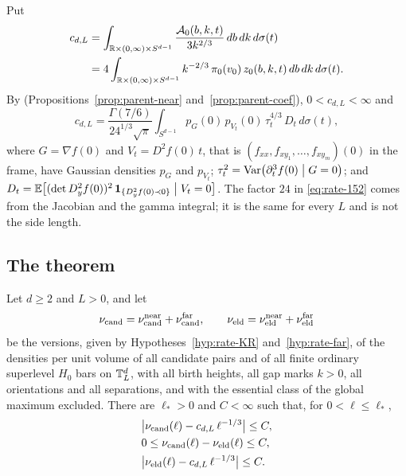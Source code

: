 \begin{definition}\label{def:rate-coef}
Put
\begin{equation}\label{eq:rate-c}
\begin{aligned}
c_{d,L}&=\int_{\mathbb R\times(0,\infty)\times S^{d-1}}\frac{\mathcal A_0(b,k,t)}{3k^{2/3}}\,db\,dk\,d\sigma(t)\\
&=4\int_{\mathbb R\times(0,\infty)\times S^{d-1}}k^{-2/3}\,\pi_0(v_0)\,z_0(b,k,t)\,db\,dk\,d\sigma(t).
\end{aligned}
\end{equation}
By \cite[(13.6) and \S15]{parentP} (Propositions~\ref{prop:parent-near} and~\ref{prop:parent-coef}), $0<c_{d,L}<\infty$ and
\begin{equation}\label{eq:rate-152}
c_{d,L}=\frac{\Gamma(7/6)}{24^{1/3}\sqrt\pi}\int_{S^{d-1}}p_G(0)\,p_{V_t}(0)\,\tau_t^{4/3}\,D_t\,d\sigma(t),
\end{equation}
where $G=\nabla f(0)$ and $V_t=D^2f(0)\,t$, that is $(f_{xx},f_{xy_1},\dots,f_{xy_m})(0)$ in the frame, have Gaussian densities $p_G$ and $p_{V_t}$; $\tau_t^2=\operatorname{Var}\bigl(\partial_t^3f(0)\bigm|G=0\bigr)$; and $D_t=\mathbb E\bigl[(\det D_y^2f(0))^2\,\mathbf 1_{\{D_y^2f(0)\prec0\}}\bigm|V_t=0\bigr]$. The factor $24$ in \eqref{eq:rate-152} comes from the Jacobian and the gamma integral; it is the same for every $L$ and is not the side length.
\end{definition}

\subsection*{The theorem}

\begin{theorem}\label{thm:rate-bounded}
Let $d\ge2$ and $L>0$, and let
\[
\nu_{\mathrm{cand}}=\nu^{\rm near}_{\mathrm{cand}}+\nu^{\rm far}_{\mathrm{cand}},\qquad \nu_{\mathrm{eld}}=\nu^{\rm near}_{\mathrm{eld}}+\nu^{\rm far}_{\mathrm{eld}}
\]
be the versions, given by Hypotheses~\ref{hyp:rate-KR} and~\ref{hyp:rate-far}, of the densities per unit volume of all candidate pairs and of all finite ordinary superlevel $H_0$ bars on $\mathbb T^d_L$, with all birth heights, all gap marks $k>0$, all orientations and all separations, and with the essential class of the global maximum excluded. There are $\ell_*>0$ and $C<\infty$ such that, for $0<\ell\le\ell_*$,
\begin{equation}\label{eq:rate-R1}
\begin{aligned}
&\bigl|\nu_{\mathrm{cand}}(\ell)-c_{d,L}\,\ell^{-1/3}\bigr|\le C,\\
&0\le\nu_{\mathrm{cand}}(\ell)-\nu_{\mathrm{eld}}(\ell)\le C,\\
&\bigl|\nu_{\mathrm{eld}}(\ell)-c_{d,L}\,\ell^{-1/3}\bigr|\le C .
\end{aligned}
\end{equation}
\end{theorem}

